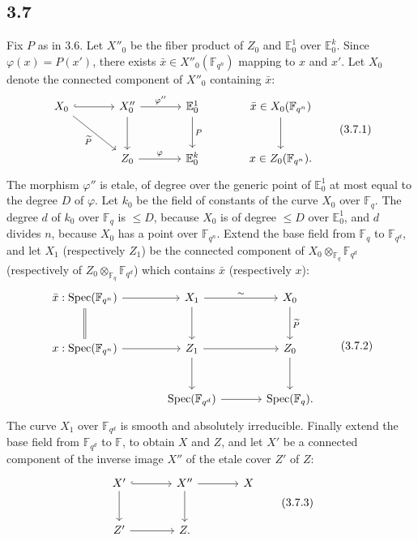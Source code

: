 \documentclass[11pt]{article}
\newcommand{\F}{\mathbb{F}}
\newcommand{\Spec}{\operatorname{Spec}}
\begin{document}
\subsection*{3.7}
Fix $P$ as in 3.6.
Let $X''_0$ be the fiber product of $Z_0$ and $\mathbb E^1_0$ over $\mathbb E^k_0$.
Since $\varphi(x)=P(x')$, there exists $\bar x\in X''_0(\F_{q^n})$ mapping to $x$ and $x'$.
Let $X_0$ denote the connected component of $X''_0$ containing $\bar x$:
\begin{equation}
\begin{tikzcd}[column sep=large,row sep=large]
X_0 \arrow[r,hook] \arrow[dr,"\widetilde P"'] & X''_0 \arrow[r,"\varphi''"] \arrow[d] & \mathbb E^1_0 \arrow[d,"P"] & \bar x\in X_0(\F_{q^n}) \arrow[d]\\
& Z_0 \arrow[r,"\varphi"] & \mathbb E^k_0 & x\in Z_0(\F_{q^n}) .
\end{tikzcd}
\tag{3.7.1}
\end{equation}
The morphism $\varphi''$ is etale, of degree over the generic point of $\mathbb E^1_0$ at most equal to the degree $D$ of $\varphi$.
Let $k_0$ be the field of constants of the curve $X_0$ over $\F_q$.
The degree $d$ of $k_0$ over $\F_q$ is $\le D$, because $X_0$ is of degree $\le D$ over $\mathbb E^1_0$, and $d$ divides $n$, because $X_0$ has a point over $\F_{q^n}$.
Extend the base field from $\F_q$ to $\F_{q^d}$, and let $X_1$ (respectively $Z_1$) be the connected component of $X_0\otimes_{\F_q}\F_{q^d}$ (respectively of $Z_0\otimes_{\F_q}\F_{q^d}$) which contains $\bar x$ (respectively $x$):
\begin{equation}
\begin{tikzcd}[column sep=large,row sep=large]
\bar x:\Spec(\F_{q^n}) \arrow[r] \arrow[d,equal] & X_1 \arrow[r,"\sim"] \arrow[d] & X_0 \arrow[d,"\widetilde P"]\\
x:\Spec(\F_{q^n}) \arrow[r] & Z_1 \arrow[r] \arrow[d] & Z_0 \arrow[d]\\
& \Spec(\F_{q^d}) \arrow[r] & \Spec(\F_q) .
\end{tikzcd}
\tag{3.7.2}
\end{equation}
The curve $X_1$ over $\F_{q^d}$ is smooth and absolutely irreducible.
Finally extend the base field from $\F_{q^d}$ to $\F$, to obtain $X$ and $Z$, and let $X'$ be a connected component of the inverse image $X''$ of the etale cover $Z'$ of $Z$:
\begin{equation}
\begin{tikzcd}[column sep=large,row sep=large]
X' \arrow[r,hook] \arrow[d] & X'' \arrow[r] \arrow[d] & X\\
Z' \arrow[r] & Z . &
\end{tikzcd}
\tag{3.7.3}
\end{equation}
\end{document}
